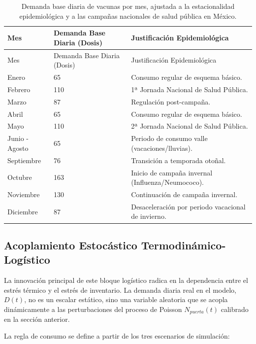 \documentclass[
  spanish,
  us-letterpaper,
]{scrreprt}
\numberwithin{equation}{section}
\theoremstyle{plain}
\theoremstyle{plain}
\theoremstyle{plain}
\theoremstyle{definition}
\theoremstyle{remark}
\begin{document}
\begin{longtable}[]{@{}lll@{}}
\caption{Demanda base diaria de vacunas por mes, ajustada a la
estacionalidad epidemiológica y a las campañas nacionales de salud
pública en México.}\label{tbl-demanda-base}\tabularnewline
\toprule\noalign{}
Mes & Demanda Base Diaria (Dosis) & Justificación Epidemiológica \\
\midrule\noalign{}
\endfirsthead
\toprule\noalign{}
Mes & Demanda Base Diaria (Dosis) & Justificación Epidemiológica \\
\midrule\noalign{}
\endhead
\bottomrule\noalign{}
\endlastfoot
Enero & 65 & Consumo regular de esquema básico. \\
Febrero & 110 & 1ª Jornada Nacional de Salud Pública. \\
Marzo & 87 & Regulación post-campaña. \\
Abril & 65 & Consumo regular de esquema básico. \\
Mayo & 110 & 2ª Jornada Nacional de Salud Pública. \\
Junio - Agosto & 65 & Periodo de consumo valle (vacaciones/lluvias). \\
Septiembre & 76 & Transición a temporada otoñal. \\
Octubre & 163 & Inicio de campaña invernal (Influenza/Neumococo). \\
Noviembre & 130 & Continuación de campaña invernal. \\
Diciembre & 87 & Desaceleración por periodo vacacional de invierno. \\
\end{longtable}

\subsection{Acoplamiento Estocástico
Termodinámico-Logístico}\label{acoplamiento-estocuxe1stico-termodinuxe1mico-loguxedstico}

La innovación principal de este bloque logístico radica en la
dependencia entre el estrés térmico y el estrés de inventario. La
demanda diaria real en el modelo, \(D(t)\), no es un escalar estático,
sino una variable aleatoria que se acopla dinámicamente a las
perturbaciones del proceso de Poisson \(N_{puerta}(t)\) calibrado en la
sección anterior.

La regla de consumo se define a partir de los tres escenarios de
simulación:
\end{document}
